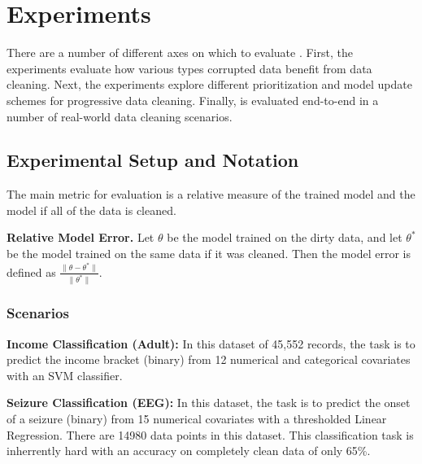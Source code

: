 
\section{Experiments}\label{eval}
There are a number of different axes on which to evaluate \sys.
First, the experiments evaluate how various types corrupted data benefit from data cleaning.
Next, the experiments explore different prioritization and model update schemes for progressive data cleaning.
Finally, \sys is evaluated end-to-end in a number of real-world data cleaning scenarios.

\subsection{Experimental Setup and Notation}
The main metric for evaluation is a relative measure of the trained model and the model if all of the data is cleaned.

\vspace{0.25em}

\noindent\textbf{Relative Model Error. } Let $\theta$ be the model trained on the dirty data, and let $\theta^*$ be the model trained on the same data if it was cleaned. Then the model error is defined as $\frac{\|\theta - \theta^*\|}{\|\theta^*\|}$.

\subsubsection{Scenarios}


\vspace{0.25em}

\noindent\textbf{Income Classification (Adult): } In this dataset of 45,552 records, the task is to predict the income bracket (binary) from 12 numerical and categorical covariates with an SVM classifier. 

\vspace{0.25em}

\noindent\textbf{Seizure Classification (EEG): } In this dataset, the task is to predict the onset of a seizure (binary) from 15 numerical covariates with a thresholded Linear Regression. There are 14980 data points in this dataset. This classification task is inherrently hard with an accuracy on completely clean data of only 65\%.

